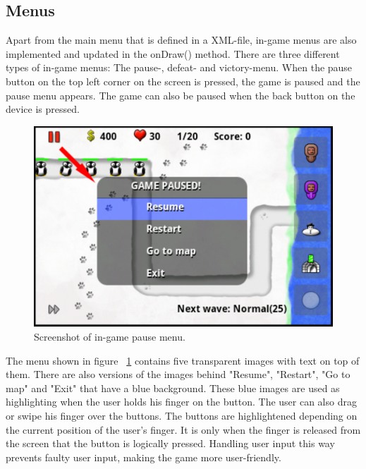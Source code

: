 \clearpage

\subsection{Menus}

Apart from the main menu that is defined in a XML-file, in-game menus are also implemented and updated in the onDraw() method. There are three different types of in-game menus: The pause-, defeat- and victory-menu. When the pause button on the top left corner on the screen is pressed, the game is paused and the pause menu appears. The game can also be paused when the back button on the device is pressed.

\begin{figure}[here]
\begin{center}
\includegraphics[scale=0.6]{pics/chapters/chapter4/in-gamePauseMenu}
\end{center}
\caption{Screenshot of in-game pause menu.}
\label{fig:ingamePauseMenu}
\end{figure}

The menu shown in figure ~\ref{fig:ingamePauseMenu} contains five transparent images with text on top of them. There are also versions of the images behind "Resume", "Restart", "Go to map" and "Exit" that have a blue background. These blue images are used as highlighting when the user holds his finger on the button. The user can also drag or swipe his finger over the buttons. The buttons are highlightened depending on the current position of the user's finger. It is only when the finger is released from the screen that the button is logically pressed. Handling user input this way prevents faulty user input, making the game more user-friendly.

